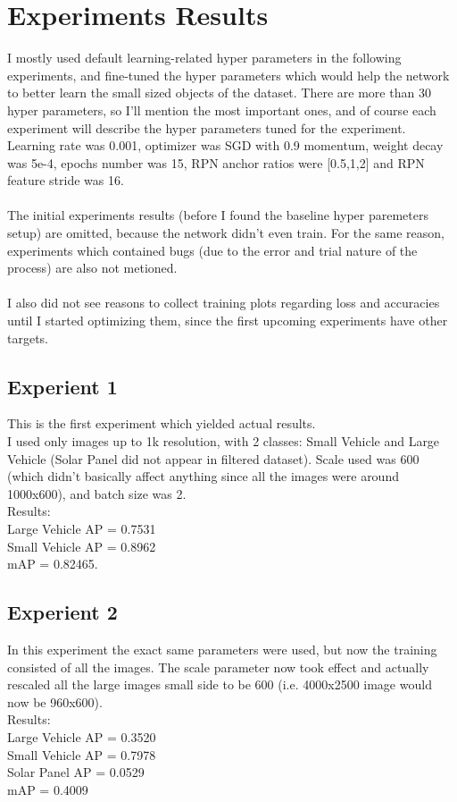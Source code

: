 \documentclass[]{article}
\begin{document}
\section{Experiments Results}
I mostly used default learning-related hyper parameters in the following experiments, and fine-tuned the hyper parameters which would help the network to better learn the small sized objects of the dataset. There are more than 30 hyper parameters, so I'll mention the most important ones, and of course each experiment will describe the hyper parameters tuned for the experiment.\\
Learning rate was 0.001, optimizer was SGD with 0.9 momentum, weight decay was 5e-4, epochs number was 15, RPN anchor ratios were [0.5,1,2] and RPN feature stride was 16.
\\\\
The initial experiments results (before I found the baseline hyper paremeters setup) are omitted, because the network didn't even train. For the same reason, experiments which contained bugs (due to the error and trial nature of the process) are also not metioned.
\\\\
I also did not see reasons to collect training plots regarding loss and accuracies until I started optimizing them, since the first upcoming experiments have other targets.

\subsection{Experient 1}
This is the first experiment which yielded actual results.\\
I used only images up to 1k resolution, with 2 classes: Small Vehicle and Large Vehicle (Solar Panel did not appear in filtered dataset).
Scale used was 600 (which didn't basically affect anything since all the images were around 1000x600), and batch size was 2.\\
Results:\\
Large Vehicle AP = 0.7531\\
Small Vehicle AP = 0.8962\\
mAP = 0.82465.\\

\subsection{Experient 2}
In this experiment the exact same parameters were used, but now the training consisted of all the images. The scale parameter now took effect and actually rescaled all the large images small side to be 600 (i.e. 4000x2500 image would now be 960x600).\\
Results:\\
Large Vehicle AP = 0.3520\\
Small Vehicle AP = 0.7978\\
Solar Panel AP = 0.0529\\
mAP = 0.4009
\end{document}

